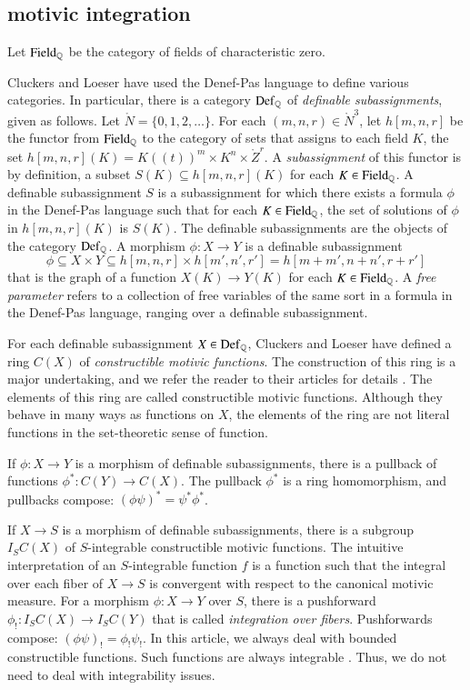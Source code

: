 \subsection{motivic integration}

Let ${\operatorname{Field}}_{\mathbb{Q}}$ be the category of fields of characteristic zero.

Cluckers and Loeser have used the Denef-Pas language to define various
categories.  In particular, there is a category ${\operatorname{Def}}_{\mathbb{Q}}$ of {\it
  definable subassignments}, given as follows.  Let
$\ring{N}=\{0,1,2,\ldots\}$.  For each $(m,n,r)\in\ring{N}^3$, let
$h[m,n,r]$ be the functor from ${\operatorname{Field}}_{\mathbb{Q}}$ to the category of sets
that assigns to each field $K$, the set $h[m,n,r](K)=K((t))^m\times
K^n\times \ring{Z}^r$.  A {\it subassignment} of this functor is by
definition, a subset $S(K) \subseteq h[m,n,r](K)$ for each
$K\in{\operatorname{Field}}_{\mathbb{Q}}$.  A definable subassignment $S$ is a subassignment
for which there exists a formula $\phi$ in the Denef-Pas language such
that for each $K\in{\operatorname{Field}}_{\mathbb{Q}}$, the set of solutions of $\phi$ in
$h[m,n,r](K)$ is $S(K)$.  The definable subassignments are the objects
of the category ${\operatorname{Def}}_{\mathbb{Q}}$.  A morphism $\phi:X\to Y$ is a
definable subassignment
\[
\phi\subseteq X\times Y
\subseteq h[m,n,r]\times h[m',n',r'] = h[m+m',n+n',r+r']
\]
that is the graph of a function $X(K)\to Y(K)$ for each $K\in
{\operatorname{Field}}_{\mathbb{Q}}$.
A {\it free parameter} refers to a collection of free variables of the
same sort in a formula in the Denef-Pas language, ranging over a
definable subassignment.  

For each definable subassignment $X\in {\operatorname{Def}}_{\mathbb{Q}}$, Cluckers and
Loeser have defined a ring $C(X)$ of {\it constructible motivic
  functions}.  The construction of this ring is a major undertaking,
and we refer the reader to their articles for details
\cite{cluckers2008constructible}.  The elements of this ring are
called constructible motivic functions.  Although they behave in many
ways as functions on $X$, the elements of the ring are not literal
functions in the set-theoretic sense of function.

If $\phi:X\to Y$ is a morphism of definable subassignments, there is a
pullback of functions $\phi^*:C(Y)\to C(X)$.  The pullback $\phi^*$ is
a ring homomorphism, and pullbacks compose: $(\phi\psi)^* = \psi^*
\phi^*$.

If $X\to S$ is a morphism of definable subassignments, there is a
subgroup $I_S C(X)$ of $S$-integrable constructible motivic functions.
The intuitive interpretation of an $S$-integrable function $f$ is a
function such that the integral over each fiber of $X\to S$ is
convergent with respect to the canonical motivic measure.  For a
morphism $\phi: X\to Y$ over $S$, there is a pushforward
$\phi_!:I_SC(X)\to I_SC(Y)$ that is called {\it integration over
  fibers}.  Pushforwards compose: $(\phi\psi)_! = \phi_!\psi_!$.  In
this article, we always deal with bounded constructible functions.
Such functions are always integrable
\cite[Prop~12.2.2]{cluckers2008constructible}.  Thus, we do not need
to deal with integrability issues.


